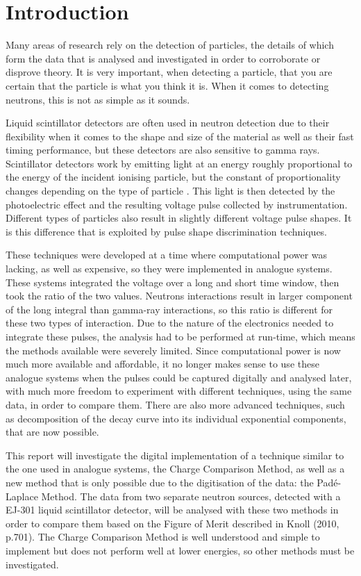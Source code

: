\documentclass[11pt]{article}
\numberwithin{equation}{section}
\numberwithin{figure}{section}
\numberwithin{table}{section}
\begin{document}
\section{Introduction}\label{sec:Introduction}
\par Many areas of research rely on the detection of particles, the details of which form the data that is analysed and investigated in order to corroborate or disprove theory. It is very important, when detecting a particle, that you are certain that the particle is what you think it is. When it comes to detecting neutrons, this is not as simple as it sounds. 
\par Liquid scintillator detectors are often used in neutron detection due to their flexibility when it comes to the shape and size of the material as well as their fast timing performance, but these detectors are also sensitive to gamma rays. Scintillator detectors work by emitting light at an energy roughly proportional to the energy of the incident ionising particle, but the constant of proportionality changes depending on the type of particle \cite{Knoll}. This light is then detected by the photoelectric effect and the resulting voltage pulse collected by instrumentation. Different types of particles also result in slightly different voltage pulse shapes. It is this difference that is exploited by pulse shape discrimination techniques. 
\par These techniques were developed at a time where computational power was lacking, as well as expensive, so they were implemented in analogue systems. These systems integrated the voltage over a long and short time window, then took the ratio of the two values. Neutrons interactions result in larger component of the long integral than gamma-ray interactions, so this ratio is different for these two types of interaction. Due to the nature of the electronics needed to integrate these pulses, the analysis had to be performed at run-time, which means the methods available were severely limited. Since computational power is now much more available and affordable, it no longer makes sense to use these analogue systems when the pulses could be captured digitally and analysed later, with much more freedom to experiment with different techniques, using the same data, in order to compare them. There are also more advanced techniques, such as decomposition of the decay curve into its individual exponential components, that are now possible.
\par This report will investigate the digital implementation of a technique similar to the one used in analogue systems, the Charge Comparison Method, as well as a new method that is only possible due to the digitisation of the data: the Pad\'e-Laplace Method. The data from two separate neutron sources, detected with a EJ-301 liquid scintillator detector, will be analysed with these two methods in order to compare them based on the Figure of Merit described in Knoll (2010, p.701). The Charge Comparison Method is well understood and simple to implement but does not perform well at lower energies, so other methods must be investigated.
\end{document}

